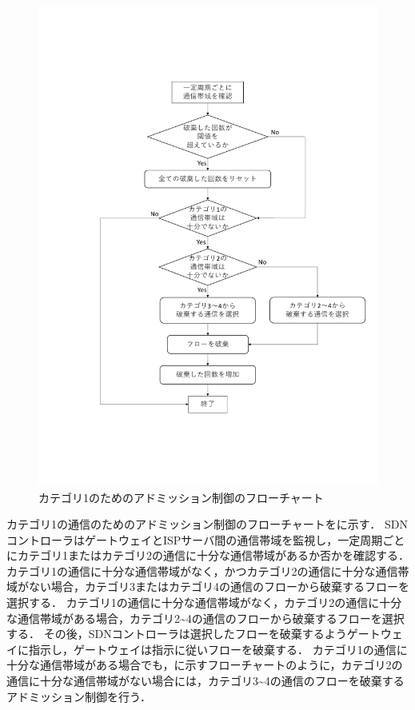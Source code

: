 \documentclass[a4paper,11pt,uplatex]{ujreport}
\begin{document}
  \begin{figure}[tb]
    \centering
    \includegraphics[width=0.94\linewidth]{img/adomission_c1.pdf}
    \caption{カテゴリ1のためのアドミッション制御のフローチャート}
    \label{fig:adomission}
  \end{figure}

  カテゴリ1の通信のためのアドミッション制御のフローチャートをに示す．
  SDNコントローラはゲートウェイとISPサーバ間の通信帯域を監視し，一定周期ごとにカテゴリ1またはカテゴリ2の通信に十分な通信帯域があるか否かを確認する．
  カテゴリ1の通信に十分な通信帯域がなく，かつカテゴリ2の通信に十分な通信帯域がない場合，カテゴリ3またはカテゴリ4の通信のフローから破棄するフローを選択する．
  カテゴリ1の通信に十分な通信帯域がなく，カテゴリ2の通信に十分な通信帯域がある場合，カテゴリ2\textasciitilde4の通信のフローから破棄するフローを選択する．
  その後，SDNコントローラは選択したフローを破棄するようゲートウェイに指示し，ゲートウェイは指示に従いフローを破棄する．
  カテゴリ1の通信に十分な通信帯域がある場合でも，に示すフローチャートのように，カテゴリ2の通信に十分な通信帯域がない場合には，カテゴリ3\textasciitilde4の通信のフローを破棄するアドミッション制御を行う．\par
\end{document}
